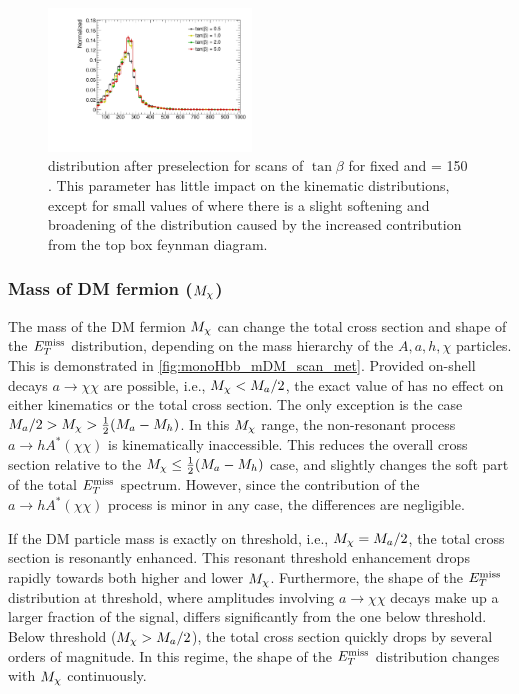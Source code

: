 \begin{figure}
\centering
\includegraphics[width=0.48\textwidth]{texinputs/04_grid/figures/monoz/leptonic/TanbScan_mA600_ma150_MET.pdf} 
\caption{\MET distribution after preselection for scans of $\tan{\beta}$ for fixed  \GeV and \ma = 150 \GeV. This parameter has little impact on the kinematic distributions, except for small values of \tanb where there is a slight softening and broadening of the \MET distribution caused by the increased contribution from the top box feynman diagram.}
\label{fig:monoz_kin_tanb}
\end{figure}

\subsubsection{Mass of DM fermion ($M_{\chi}$)}

The mass of the DM fermion $M_{\chi}$ can change the total cross section and shape of the $E_T^\mathrm{miss}$ distribution, depending on the mass hierarchy of the $A,a,h,\chi$ particles. This is demonstrated in \autoref{fig:monoHbb_mDM_scan_met}. 
Provided on-shell  decays $a\to\chi\chi$ are possible, i.e., $M_{\chi} < M_{a}/2$, the exact value of \mDM has no effect on either kinematics or the total cross section. 
The only exception is the case $M_{a}/2 > M_{\chi} > \frac{1}{2}(M_{a} - M_h)$. In this  $M_{\chi}$ range, the non-resonant process $a \to h A^*\left(\chi\chi\right) $ is kinematically inaccessible. 
This reduces the overall cross section relative to the $M_{\chi} \leq \frac{1}{2}(M_{a} - M_h)$ case, and slightly changes the soft part of the total $E_T^\mathrm{miss}$ spectrum. 
However, since the contribution of the $a \to h A^*\left(\chi \chi\right)$ process is minor in any case, the differences are negligible.

If the DM particle mass is exactly on threshold, i.e., $M_{\chi} = M_{a}/2$, the total cross section is resonantly enhanced. 
This resonant threshold enhancement drops rapidly towards both higher and lower $M_{\chi}$. Furthermore, the shape of the $E_T^\mathrm{miss}$ distribution at threshold, where amplitudes involving $a\to\chi\chi$ decays make up a larger fraction of the signal, differs significantly from the one below threshold. 
Below threshold ($M_{\chi} > M_{a}/2$), the total cross section quickly drops by several orders of magnitude. In this regime, the shape of the $E_T^\mathrm{miss}$ distribution changes with $M_{\chi}$ continuously.

